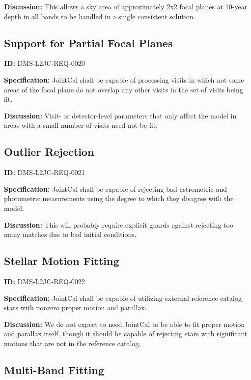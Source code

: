 \documentclass[SE,toc,lsstdraft]{lsstdoc}
\begin{document}
\textbf{Discussion:}
This allows a sky area of approximately 2x2 focal planes at 10-year depth in all bands to be handled in a single consistent solution.

\subsection{Support for Partial Focal Planes}

\label{DMS-L2JC-REQ-0020}
\textbf{ID:} DMS-L2JC-REQ-0020

\textbf{Specification:}
JointCal shall be capable of processing visits in which not some areas of the focal plane do not overlap any other visits in the set of visits being fit.

\textbf{Discussion:}
Visit- or detector-level parameters that only affect the model in areas with a small number of visits need not be fit.

\subsection{Outlier Rejection}

\label{DMS-L2JC-REQ-0021}
\textbf{ID:} DMS-L2JC-REQ-0021

\textbf{Specification:}
JointCal shall be capable of rejecting bad astrometric and photometric measurements using the degree to which they disagree with the model.

\textbf{Discussion:}
This will probably require explicit guards against rejecting too many matches due to bad initial conditions.

\subsection{Stellar Motion Fitting}

\label{DMS-L2JC-REQ-0022}
\textbf{ID:} DMS-L2JC-REQ-0022

\textbf{Specification:}
JointCal shall be capable of utilizing external reference catalog stars with nonzero proper motion and parallax.

\textbf{Discussion:}
We do not expect to need JointCal to be able to fit proper motion and parallax itself, though it should be capable of rejecting stars with significant motions that are not in the reference catalog.

\subsection{Multi-Band Fitting}
\end{document}
